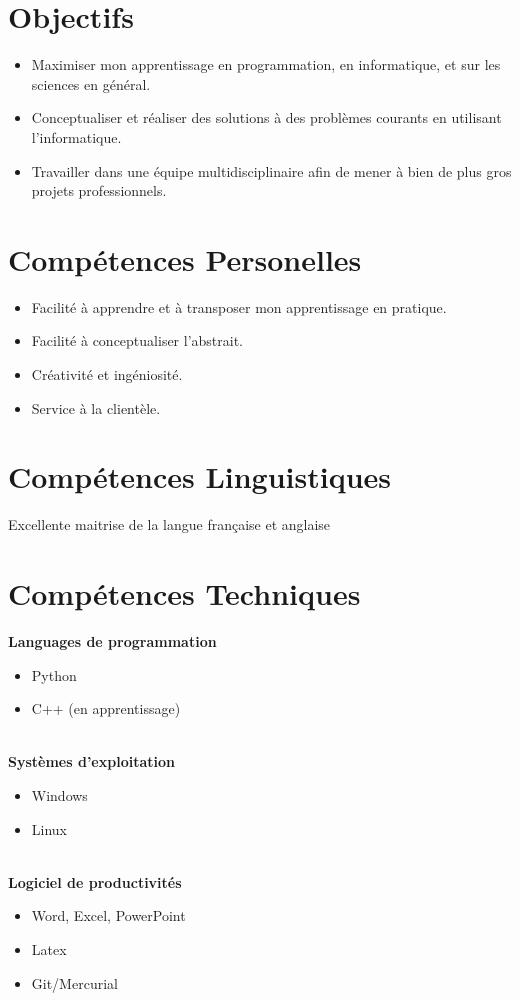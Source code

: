 \documentclass[11pt,a4paper,roman]{moderncv}        %
\begin{document}
\makecvtitle

\section{Objectifs}
\begin{itemize}
\item Maximiser mon apprentissage en programmation, en informatique, et sur les sciences en général.
\item Conceptualiser et réaliser des solutions à des problèmes courants en utilisant l’informatique.
\item Travailler dans une équipe multidisciplinaire afin de mener à bien de plus gros projets professionnels.
\end{itemize}

\section{Compétences Personelles}
\begin{itemize}
\item Facilité à apprendre et à transposer mon apprentissage en pratique.
\item Facilité à conceptualiser l’abstrait.
\item Créativité et ingéniosité.
\item Service à la clientèle.
\end{itemize}

\section{Compétences Linguistiques}
Excellente maitrise de la langue française et anglaise

\section{Compétences Techniques}
{\bfseries Languages de programmation}
\begin{itemize}\item Python \item C++ (en apprentissage)\end{itemize}
\hfill\\
{\bfseries Systèmes d'exploitation}
\begin{itemize}\item Windows \item Linux \end{itemize}
\hfill\\
{\bfseries Logiciel de productivités}
\begin{itemize}\item Word, Excel, PowerPoint\item Latex \item Git/Mercurial\end{itemize}
\end{document}
